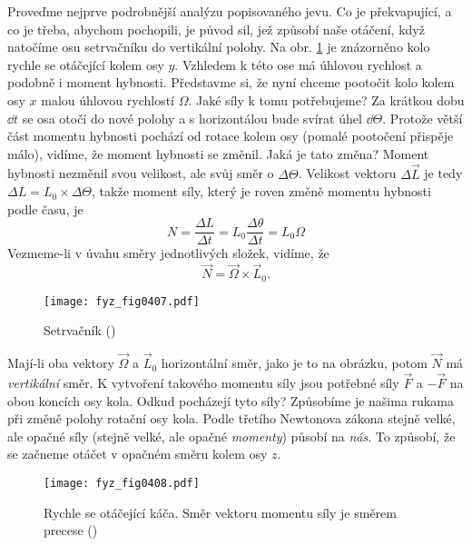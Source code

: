     Proveďme nejprve podrobnější analýzu popisovaného jevu. Co je překvapující, a co je třeba,
    abychom pochopili, je původ sil, jež způsobí naše otáčení, když natočíme osu setrvačníku do
    vertikální polohy. Na obr. \ref{fyz:fig0407} je znázorněno kolo rychle se otáčející kolem osy
    \(y\). Vzhledem k této ose má úhlovou rychlost a podobně i moment hybnosti. Představme si, že
    nyní chceme pootočit kolo kolem osy \(x\) malou úhlovou rychlostí \(\Omega\). Jaké síly k tomu
    potřebujeme? Za krátkou dobu \(\dd{t}\) se osa otočí do nové polohy a s horizontálou bude svírat
    úhel \(\dd{\Theta}\). Protože větší část momentu hybnosti pochází od rotace kolem osy (pomalé
    pootočení přispěje málo), vidíme, že moment hybnosti se změnil. Jaká je tato změna? Moment
    hybnosti nezměnil svou velikost, ale svůj směr o \(\Delta\Theta\). Velikost vektoru
    \(\Delta\vec{L}\) je tedy \(\Delta L = L_0\times\Delta\Theta\), takže moment síly, který je
    roven změně momentu hybnosti podle času, je
    \begin{equation*}
      N = \dfrac{ΔL}{Δt} = L_0\dfrac{Δθ}{Δt}=L_0Ω
    \end{equation*}
    Vezmeme-li v úvahu směry jednotlivých složek, vidíme, že
    \begin{equation}\label{fyz:eq724}
      \vec{N} =\vec{Ω}\times\vec{L}_0.
    \end{equation}

    \begin{figure}[ht!] %
      \centering
      \texttt{[image: fyz\_fig0407.pdf]}
      \caption{Setrvačník
               (\cite[s.~279]{Feynman01})}
      \label{fyz:fig0407}
    \end{figure}

    Mají-li oba vektory \(\vec{\Omega}\) a \(\vec{L}_0\) horizontální směr, jako je to na obrázku,
    potom \(\vec{N}\) má \emph{vertikální} směr. K vytvoření takového momentu síly jsou potřebné
    síly \(\vec{F}\) a \(-\vec{F}\) na obou koncích osy kola. Odkud pocházejí tyto síly? Způsobíme
    je našima rukama při změně polohy rotační osy kola. Podle třetího Newtonova zákona stejně velké,
    ale opačné síly (stejně velké, ale opačné \emph{momenty}) působí na \emph{nás}. To způsobí, že
    se začneme otáčet v opačném směru kolem osy \(z\).   
    
    \begin{figure}[ht!] %
      \centering
      \texttt{[image: fyz\_fig0408.pdf]}
      \caption{Rychle se otáčející káča. Směr vektoru momentu síly je směrem precese 
               (\cite[s.~280]{Feynman01})}
      \label{fyz:fig0408}
    \end{figure}


